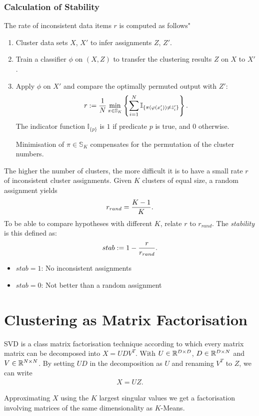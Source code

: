\subsubsection{Calculation of Stability}
The rate of inconsistent data items $r$ is computed as follows"
\begin{enumerate}
    \item Cluster data sets $X$, $X'$ to infer assignments $Z$, $Z'$.
    \item Train a classifier $\phi$ on $(X,Z)$ to transfer the clustering results $Z$ on $X$ to $X'$.
    \item Apply $\phi$ on $X'$ and compare the optimally permuted output with $Z'$:
    \begin{align*}
        r:= {1\over N} \min_{\pi \in \mathbb S_K} \left\{ \sum_{i=1}^N \mathbb I_{\{ \pi(\phi(x_i'))\neq\hat z_i' \}}\right\}.
    \end{align*}
The indicator function $\mathbb I_{\{p\}}$ is $1$ if predicate $p$ is true, and $0$ otherwise.

Minimisation of $\pi\in \mathbb S_K$ compensates for the permutation of the cluster numbers.
\end{enumerate}
The higher the number of clusters, the more difficult it is to have a small rate $r$ of inconsistent cluster assignments. Given $K$ clusters of equal size, a random assignment yields
\begin{align*}
    r_{rand} = {K-1\over K}.
\end{align*}
To be able to compare hypotheses with different $K$, relate $r$ to $r_{rand}$. The \emph{stability} is this defined as:
\begin{align*}
    stab := 1 - {r \over r_{rand}}.
\end{align*}
\begin{itemize}
    \item $stab=1$: No inconsistent assignments
    \item $stab=0$: Not better than a random assignment
\end{itemize}

\section{Clustering as Matrix Factorisation}
SVD is a class matrix factorisation technique according to which every matrix matrix can be decomposed into $X=UDV^T$. With $U\in \R^{D\times D}$, $D\in \R^{D\times N}$ and $V\in \R^{N\times N}$.
By setting $UD$ in the decomposition as $U$ and renaming $V^T$ to $Z$, we can write
\begin{align*}
    X= UZ.
\end{align*}

Approximating $X$ using the $K$ largest singular values we get a factorisation involving matrices of the same dimensionality as $K$-Means. 




